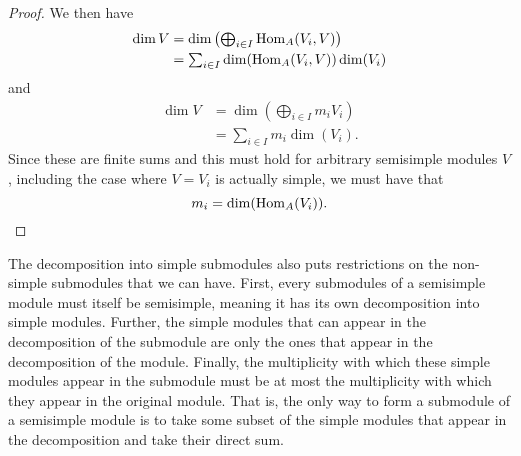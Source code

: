 \begin{lma}{}{}
\begin{proof}
        We then have
        \begin{align}
            \dim V &= \dim\left( {\textstyle \bigoplus_{i \in I}} \operatorname{Hom}_A(V_i, V) \right)\\
            &= {\textstyle \sum_{i \in I}} \dim(\operatorname{Hom}_A(V_i, V)) \dim(V_i)
        \end{align}
        and
        \begin{align}
            \dim V &= \dim\left( {\textstyle \bigoplus_{i \in I}} m_i V_i \right)\\
            &= {\textstyle \sum_{i \in I}} m_i \dim (V_i).
        \end{align}
        Since these are finite sums and this must hold for arbitrary semisimple modules \(V\), including the case where \(V = V_i\) is actually simple, we must have that
        \begin{equation*}
            m_i = \dim(\operatorname{Hom}_A(V_i)). \qedhere
        \end{equation*}
    \end{proof}
\end{lma}

The decomposition into simple submodules also puts restrictions on the non-simple submodules that we can have.
First, every submodules of a semisimple module must itself be semisimple, meaning it has its own decomposition into simple modules.
Further, the simple modules that can appear in the decomposition of the submodule are only the ones that appear in the decomposition of the module.
Finally, the multiplicity with which these simple modules appear in the submodule must be at most the multiplicity with which they appear in the original module.
That is, the only way to form a submodule of a semisimple module is to take some subset of the simple modules that appear in the decomposition and take their direct sum.

